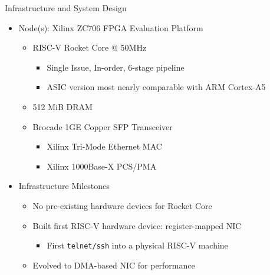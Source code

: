\begin{block}{Infrastructure and System Design}
    \begin{itemize}
        \item Node(s): Xilinx ZC706 FPGA Evaluation Platform
            \begin{itemize}
                \item RISC-V Rocket Core @ 50MHz
                    \begin{itemize}
                        \item Single Issue, In-order, 6-stage pipeline
                        \item ASIC version most nearly comparable with ARM Cortex-A5
                    \end{itemize}
                \item 512 MiB DRAM
                \item Brocade 1GE Copper SFP Transceiver
                    \begin{itemize}
                        \item Xilinx Tri-Mode Ethernet MAC
                        \item Xilinx 1000Base-X PCS/PMA
                    \end{itemize}

            \end{itemize} 
        \item Infrastructure Milestones
            \begin{itemize}
                \item No pre-existing hardware devices for Rocket Core
                \item Built first RISC-V hardware device: register-mapped NIC
                    \begin{itemize}
                        \item First \texttt{telnet/ssh} into a physical RISC-V machine
                    \end{itemize}
                \item Evolved to DMA-based NIC for performance
            \end{itemize}
    \end{itemize}


\end{block}
